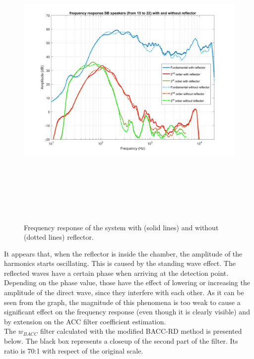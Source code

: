 \begin{figure}[H]
\centering
\includegraphics[width=15cm,height=15cm,keepaspectratio]{Figures/sbwithwithoutfreq}
\decoRule
\caption[Frequency response with and without reflector]{Frequency response of the system with (solid lines) and without (dotted lines) reflector.}
\label{fig:freqrespwithwithout}
\end{figure}

It appears that, when the reflector is inside the chamber, the amplitude of the harmonics starts oscillating. This is caused by the standing wave effect. The reflected waves have a certain phase when arriving at the detection point. Depending on the phase value, those have the effect of lowering or increasing the amplitude of the direct wave, since they interfere with each other. As it can be seen from the graph, the magnitude of this phenomena is too weak to cause a significant effect on the frequency response (even though it is clearly visible) and by extension on the ACC filter coefficient estimation.
\\
The $w_{BACC}$ filter calculated with the modified BACC-RD method is presented below. The black box represents a closeup of the second part of the filter. Its ratio is 70:1 with respect of the original scale.

